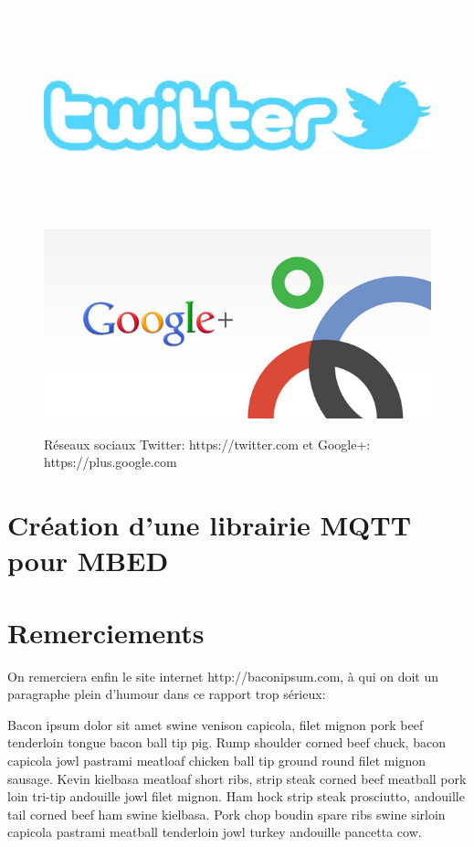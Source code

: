 \documentclass{article}
\begin{document}
\begin{figure}[h!]
    \centering
    \includegraphics[width=\linewidth/4]{img/twitter.jpg}
    \includegraphics[width=\linewidth/4]{img/plus.png}
    \caption{Réseaux sociaux Twitter: https://twitter.com et Google+: https://plus.google.com}
\end{figure}

\clearpage

\section{Création d’une librairie MQTT pour MBED}

\clearpage

\section{Remerciements}

On remerciera enfin le site internet http://baconipsum.com, à qui on doit un paragraphe plein d’humour dans ce rapport trop sérieux:

Bacon ipsum dolor sit amet swine venison capicola, filet mignon pork beef tenderloin tongue bacon ball tip pig. Rump shoulder corned beef chuck, bacon capicola jowl pastrami meatloaf chicken ball tip ground round filet mignon sausage. Kevin kielbasa meatloaf short ribs, strip steak corned beef meatball pork loin tri-tip andouille jowl filet mignon. Ham hock strip steak prosciutto, andouille tail corned beef ham swine kielbasa. Pork chop boudin spare ribs swine sirloin capicola pastrami meatball tenderloin jowl turkey andouille pancetta cow.
\end{document}
